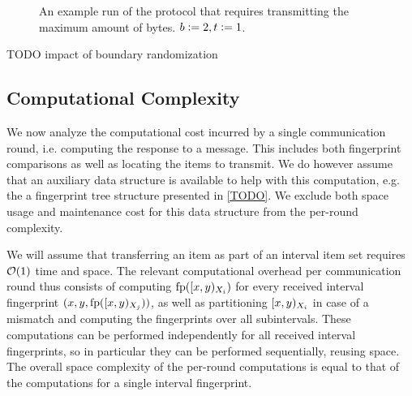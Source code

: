 \begin{figure*}
\begin{scaletikzpicturetowidth}{\textwidth}
\end{scaletikzpicturetowidth}

\caption{An example run of the protocol that requires transmitting the maximum amount of bytes. $b \vcentcolon= 2, t \vcentcolon= 1$.}

\label{fig:worst-bytes}
\end{figure*}

TODO impact of boundary randomization

\subsection{Computational Complexity}

We now analyze the computational cost incurred by a single communication round, i.e. computing the response to a message. This includes both fingerprint comparisons as well as locating the items to transmit. We do however assume that an auxiliary data structure is available to help with this computation, e.g. the a fingerprint tree structure presented in \cref{TODO}. We exclude both space usage and maintenance cost for this data structure from the per-round complexity.

We will assume that transferring an item as part of an interval item set requires $\mathcal{O}(1)$ time and space. The relevant computational overhead per communication round thus consists of computing $\operatorname{fp}([{x},{y})_{X_i})$ for every received interval fingerprint $({x}, {y}, {\operatorname{fp}([{x},{y})_{X_j})})$, as well as partitioning $[{x},{y})_{X_i}$ in case of a mismatch and computing the fingerprints over all subintervals. These computations can be performed independently for all received interval fingerprints, so in particular they can be performed sequentially, reusing space. The overall space complexity of the per-round computations is equal to that of the computations for a single interval fingerprint.

